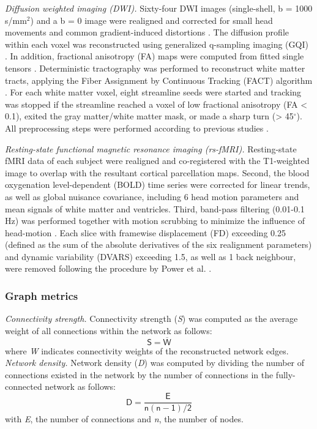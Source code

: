 \begin{refsection}
\textit{Diffusion weighted imaging (DWI).} Sixty-four DWI images (single-shell, b = 1000 s/mm$^{2}$) and a b = 0 image were realigned and corrected for small head movements and common gradient-induced distortions \citep{ANDERSSON2002177}. The diffusion profile within each voxel was reconstructed using generalized q-sampling imaging (GQI) \citep{YEH2010}. In addition, fractional anisotropy (FA) maps were computed from fitted single tensors \citep{Chang2005RESTORERE}. Deterministic tractography was performed to reconstruct white matter tracts, applying the Fiber Assignment by Continuous Tracking (FACT) algorithm \citep{Mori2002FiberTP}. For each white matter voxel, eight streamline seeds were started and tracking was stopped if the streamline reached a voxel of low fractional anisotropy (FA < 0.1), exited the gray matter/white matter mask, or made a sharp turn (> 45$^{\circ}$). All preprocessing steps were performed according to previous studies \citep{VANDENHEUVEL2016293,Romme2017ConnectomeDA}.

\textit{Resting-state functional magnetic resonance imaging (rs-fMRI).} Resting-state fMRI data of each subject were realigned and co-registered with the T1-weighted image to overlap with the resultant cortical parcellation maps. Second, the blood oxygenation level-dependent (BOLD) time series were corrected for linear trends, as well as global nuisance covariance, including 6 head motion parameters and mean signals of white matter and ventricles. Third, band-pass filtering (0.01-0.1 Hz) was performed together with motion scrubbing to minimize the influence of head-motion \citep{Power2012SpuriousBS}. Each slice with framewise displacement (FD) exceeding 0.25 (defined as the sum of the absolute derivatives of the six realignment parameters) and dynamic variability (DVARS) exceeding 1.5, as well as 1 back neighbour, were removed following the procedure by Power et al. \citep{Power2012SpuriousBS}.

\subsubsection*{Graph metrics}
\textit{Connectivity strength.} Connectivity strength (\textit{S}) was computed as the average weight of all connections within the network as follows:
\[\mathsf{S=\overline{W}}\]
where \textit{W} indicates connectivity weights of the reconstructed network edges.\\

\noindent
\textit{Network density.} Network density (\textit{D}) was computed by dividing the number of connections existed in the network by the number of connections in the fully-connected network as follows:
\[\mathsf{D=\frac{E}{n(n-1)/2}}\]
with \textit{E}, the number of connections and \textit{n}, the number of nodes.\\


\end{refsection}
